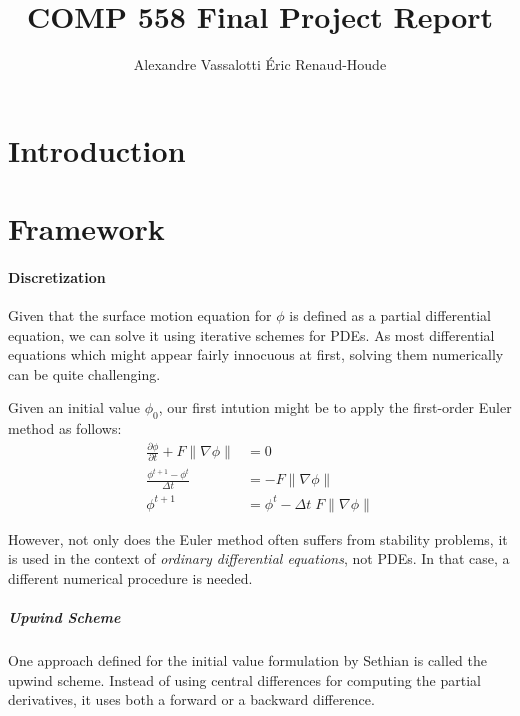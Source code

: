 \documentclass{article}
\author{Alexandre Vassalotti \quad \'{E}ric Renaud-Houde}
\title{COMP 558 Final Project Report}
\begin{document}
\maketitle
\section{Introduction}

\section{Framework}

\paragraph{Discretization}

Given that the surface motion equation for $\phi$ is defined as a partial
differential equation, we can solve it using iterative schemes for PDEs. As most
differential equations which might appear fairly innocuous at first, solving
them numerically can be quite challenging.

Given an initial value $\phi_0$, our first intution might be to apply the
first-order Euler method as follows:
\begin{align}
  \frac{\partial \phi}{\partial t} + F \|\nabla \phi\| &= 0 \\
  \frac{\phi^{t+1} - \phi^{t}}{\Delta t} &=  -F \|\nabla \phi\| \\
  \phi^{t+1} &= \phi^{t} - \Delta t \; F \|\nabla \phi\| 
\end{align}

However, not only does the Euler method often suffers from stability problems,
it is used in the context of \textit{ordinary differential equations}, not PDEs.
In that case, a different numerical procedure is needed. 

\subparagraph{Upwind Scheme}
One approach defined for the initial value formulation by
Sethian\cite{sethian1999level} \cite{sethian1999advancing} is called the upwind
scheme.  Instead of using central differences for computing the partial
derivatives, it uses both a forward or a backward difference.




\end{document}
